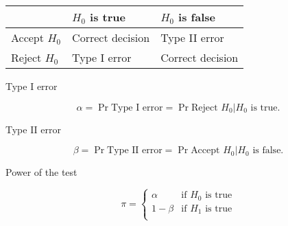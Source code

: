 \documentclass{report}
\begin{document}
\begin{table}
	\begin{center}
		\begin{tabular}[c]{|l|l|l|}
			\hline
			             & $H_0$ is true    & $H_0$ is false   \\
			\hline
			Accept $H_0$ & Correct decision & Type II error    \\
			\hline
			Reject $H_0$ & Type I error     & Correct decision \\
			\hline
		\end{tabular}
	\end{center}
\end{table}

Type I error

\[
	\alpha = \Pr{\text{Type I error}} = \Pr{\text{Reject }H_0|H_0\text{ is true}}
	.\]

Type II error

\[
	\beta = \Pr{\text{Type II error}} = \Pr{\text{Accept }H_0|H_0\text{ is false}}
	.\]

Power of the test

\[
	\pi = \begin{cases}
		\alpha  & \text{if }H_0\text{ is true} \\
		1-\beta & \text{if }H_1\text{ is true} \\
	\end{cases}
\]
\end{document}
